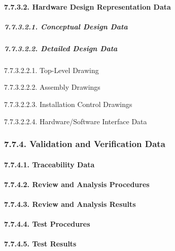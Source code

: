 \documentclass[
]{article}
\begin{document}
\hypertarget{hardware-design-representation-data}{%
\paragraph{7.7.3.2. Hardware Design Representation
Data}\label{hardware-design-representation-data}}

\hypertarget{conceptual-design-data}{%
\subparagraph{7.7.3.2.1. Conceptual Design
Data}\label{conceptual-design-data}}

\hypertarget{detailed-design-data}{%
\subparagraph{7.7.3.2.2. Detailed Design
Data}\label{detailed-design-data}}

7.7.3.2.2.1. Top-Level Drawing

7.7.3.2.2.2. Assembly Drawings

7.7.3.2.2.3. Installation Control Drawings

7.7.3.2.2.4. Hardware/Software Interface Data

\hypertarget{validation-and-verification-data}{%
\subsubsection{7.7.4. Validation and Verification
Data}\label{validation-and-verification-data}}

\hypertarget{traceability-data}{%
\paragraph{7.7.4.1. Traceability Data}\label{traceability-data}}

\hypertarget{review-and-analysis-procedures}{%
\paragraph{7.7.4.2. Review and Analysis
Procedures}\label{review-and-analysis-procedures}}

\hypertarget{review-and-analysis-results}{%
\paragraph{7.7.4.3. Review and Analysis
Results}\label{review-and-analysis-results}}

\hypertarget{test-procedures}{%
\paragraph{7.7.4.4. Test Procedures}\label{test-procedures}}

\hypertarget{test-results}{%
\paragraph{7.7.4.5. Test Results}\label{test-results}}
\end{document}
